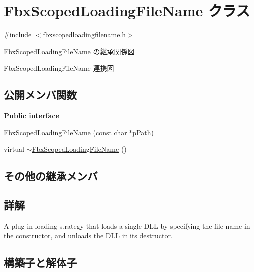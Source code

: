 \hypertarget{class_fbx_scoped_loading_file_name}{}\section{Fbx\+Scoped\+Loading\+File\+Name クラス}
\label{class_fbx_scoped_loading_file_name}


{\ttfamily \#include $<$fbxscopedloadingfilename.\+h$>$}



Fbx\+Scoped\+Loading\+File\+Name の継承関係図


Fbx\+Scoped\+Loading\+File\+Name 連携図
\subsection*{公開メンバ関数}
\begin{Indent}\textbf{ Public interface}\par
\begin{DoxyCompactItemize}
\item 
\hyperlink{class_fbx_scoped_loading_file_name_a42319408c4e447d7b52965c5cc738a8e}{Fbx\+Scoped\+Loading\+File\+Name} (const char $\ast$p\+Path)
\item 
virtual \hyperlink{class_fbx_scoped_loading_file_name_a2f15050815bcb12cdd1b461e619374d6}{$\sim$\+Fbx\+Scoped\+Loading\+File\+Name} ()
\end{DoxyCompactItemize}
\end{Indent}
\subsection*{その他の継承メンバ}


\subsection{詳解}
A plug-\/in loading strategy that loads a single D\+LL by specifying the file name in the constructor, and unloads the D\+LL in its destructor. 

\subsection{構築子と解体子}
\mbox{\label{class_fbx_scoped_loading_file_name_a42319408c4e447d7b52965c5cc738a8e}} 
